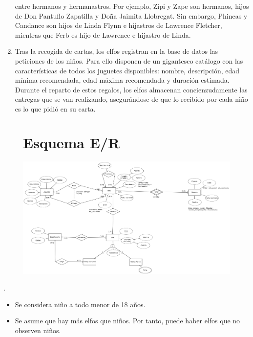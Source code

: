 \documentclass[a4paper, 11pt]{article}
\begin{document}
\begin{proy}
\begin{enumerate}
		entre hermanos y hermanastros. Por ejemplo, Zipi y Zape son hermanos, hijos de Don Pantuflo
		Zapatilla y Doña Jaimita Llobregat. Sin embargo, Phineas y Candance son hijos de Linda Flynn
		e hijastros de Lawrence Fletcher, mientras que Ferb es hijo de Lawrence e hijastro de Linda.
		\item Tras la recogida de cartas, los elfos registran en la base de datos las peticiones de los niños. Para
		ello disponen de un gigantesco catálogo con las características de todos los juguetes disponibles:
		nombre, descripción, edad mínima recomendada, edad máxima recomendada y duración
		estimada. Durante el reparto de estos regalos, los elfos almacenan concienzudamente las entregas
		que se van realizando, asegurándose de que lo recibido por cada niño es lo que pidió en su carta.
	\end{enumerate}
\end{proy}


\begin{figure}
\part*{Esquema E/R}	
	\centering
	\includegraphics[scale = 0.15, angle = 90]{Arthur Christmas ER}
\end{figure}

\newpage 

\begin{hipad}.\\
	\begin{itemize}
		\item Se considera niño a todo menor de 18 años.
		\item Se asume que hay más elfos que niños. Por tanto, puede haber elfos que no observen niños. 
	\end{itemize}
\end{hipad}
	
\end{document}
